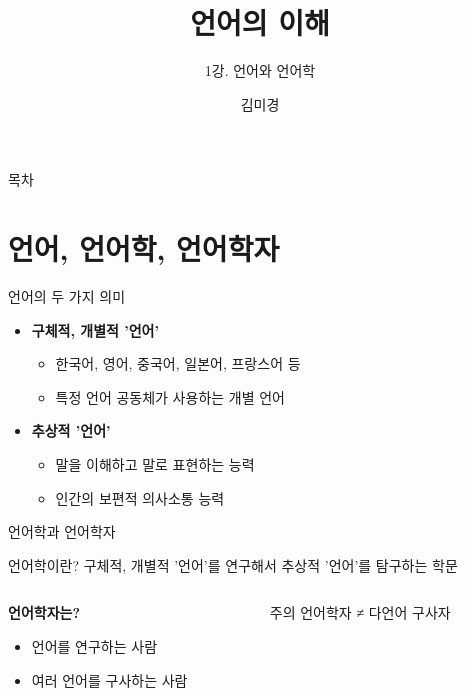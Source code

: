 \documentclass[aspectratio=169]{beamer}
\title{언어의 이해}
\subtitle{1강. 언어와 언어학}
\author{김미경}
\date{}
\begin{document}
\frame{\titlepage}

\begin{frame}{목차}
\tableofcontents
\end{frame}

\section{언어, 언어학, 언어학자}

\begin{frame}{언어의 두 가지 의미}
\begin{itemize}
\item \textbf{구체적, 개별적 '언어'}
    \begin{itemize}
    \item 한국어, 영어, 중국어, 일본어, 프랑스어 등
    \item 특정 언어 공동체가 사용하는 개별 언어
    \end{itemize}
\vspace{0.5cm}
\item \textbf{추상적 '언어'}
    \begin{itemize}
    \item 말을 이해하고 말로 표현하는 능력
    \item 인간의 보편적 의사소통 능력
    \end{itemize}
\end{itemize}
\end{frame}

\begin{frame}{언어학과 언어학자}
\begin{block}{언어학이란?}
구체적, 개별적 '언어'를 연구해서 추상적 '언어'를 탐구하는 학문
\end{block}

\vspace{0.5cm}

\begin{columns}
\begin{column}{0.5\textwidth}
\textbf{언어학자는?}
\begin{itemize}
\item[\checkmark] 언어를 연구하는 사람
\item[\texttimes] 여러 언어를 구사하는 사람
\end{itemize}
\end{column}
\begin{column}{0.5\textwidth}
\begin{alertblock}{주의}
언어학자 ≠ 다언어 구사자
\end{alertblock}
\end{column}
\end{columns}
\end{frame}
\end{document}
